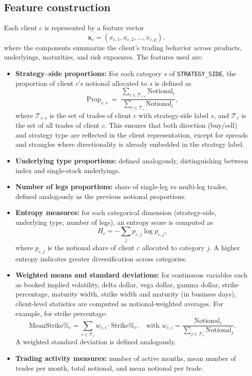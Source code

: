 \documentclass[12pt,a4paper]{report}
\begin{document}
\subsection{Feature construction}

Each client \(c\) is represented by a feature vector 
\[
    \mathbf{x}_c = (x_{c,1}, x_{c,2}, \dots, x_{c,p}),
\]
where the components summarize the client’s trading behavior across products, underlyings, maturities, and risk exposures. The features used are:

\begin{itemize}

    \item \textbf{Strategy--side proportions:} 
    For each category $s$ of \texttt{STRATEGY\_SIDE}, the proportion of client $c$'s notional allocated 
    to $s$ is defined as
    \[
        \text{Prop}_{c,s} \;=\; 
        \frac{\sum_{i \in \mathcal{T}_{c,s}} \text{Notional}_{i}}
             {\sum_{i \in \mathcal{T}_{c}} \text{Notional}_{i}},
    \]
    where $\mathcal{T}_{c,s}$ is the set of trades of client $c$ with strategy-side label $s$, 
    and $\mathcal{T}_{c}$ is the set of all trades of client $c$. 
    This ensures that both direction (buy/sell) and strategy type are reflected in the client 
    representation, except for spreads and strangles where directionality is already 
    embedded in the strategy label.


    \item \textbf{Underlying type proportions:} defined analogously, distinguishing between index and single-stock underlyings.

    \item \textbf{Number of legs proportions:} share of single-leg vs multi-leg trades, defined analogously as the previous notional proportions.

    \item \textbf{Entropy measures:} for each categorical dimension (strategy-side, underlying type, number of legs), an entropy score is computed as
    \[
        H_c = - \sum_{j} p_{c,j} \log p_{c,j},
    \]
    where \(p_{c,j}\) is the notional share of client \(c\) allocated to category \(j\). A higher entropy indicates greater diversification across categories.

    \item \textbf{Weighted means and standard deviations:} for continuous variables such as booked implied volatility, delta dollar, vega dollar, gamma dollar, strike percentage, maturity width, strike width and maturity (in business days), client-level statistics are computed as notional-weighted averages. For example, for strike percentage:
    \[
        \text{MeanStrike\%}_c = \sum_{i \in \mathcal{T}_c} w_{c,i} \cdot \text{Strike\%}_{i}, 
        \quad \text{with } w_{c,i} = \frac{\text{Notional}_i}{\sum_{j \in \mathcal{T}_c} \text{Notional}_j}.
    \]
    A weighted standard deviation is defined analogously.

    \item \textbf{Trading activity measures:} number of active months, mean number of trades per month, total notional, and mean notional per trade.
\end{itemize}
\end{document}
